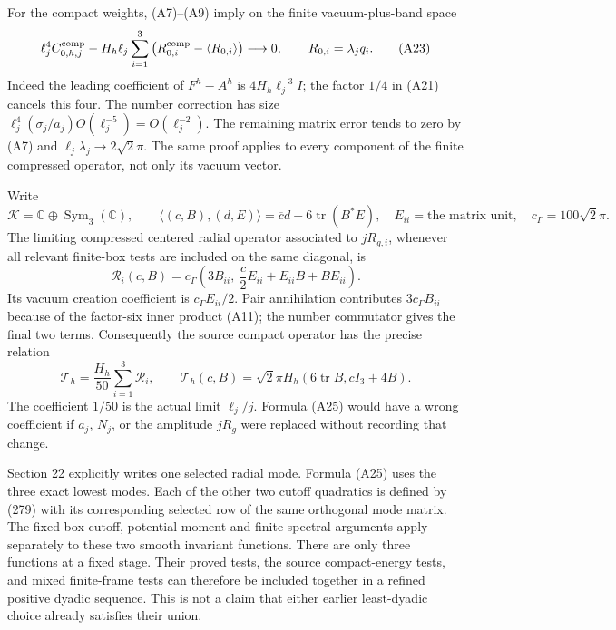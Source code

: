 \documentclass[
  11pt,
]{article}
\begin{document}
For the compact weights, (A7)--(A9) imply on the finite vacuum-plus-band
space \[
 \ell_j^4C^{\rm comp}_{0,h,j}
 -H_h\ell_j\sum_{i=1}^3
     \left(R^{\rm comp}_{0,i}-\langle R_{0,i}\rangle\right)
 \longrightarrow0,
 \qquad R_{0,i}=\lambda_jq_i.
\tag{A23}
\] Indeed the leading coefficient of \(F^h-A^h\) is
\(4H_h\ell_j^{-3}I\); the factor \(1/4\) in (A21) cancels this four. The
number correction has size
\(\ell_j^4(\sigma_j/a_j)O(\ell_j^{-5})=O(\ell_j^{-2})\). The remaining
matrix error tends to zero by (A7) and \(\ell_j\lambda_j\to2\sqrt2\pi\).
The same proof applies to every component of the finite compressed
operator, not only its vacuum vector.

Write \[
 \mathcal K=\mathbb C\oplus\operatorname{Sym}_3(\mathbb C),\qquad
 \langle(c,B),(d,E)\rangle=\overline c d+6\operatorname{tr}(B^*E),
 \quad E_{ii}=\text{the matrix unit},\quad c_\Gamma=100\sqrt2\pi.
\] The limiting compressed centered radial operator associated to
\(jR_{g,i}\), whenever all relevant finite-box tests are included on the
same diagonal, is \[
 \mathcal R_i(c,B)=c_\Gamma\left(
       3B_{ii},\ \frac c2E_{ii}+E_{ii}B+BE_{ii}\right).
\tag{A24}
\] Its vacuum creation coefficient is \(c_\Gamma E_{ii}/2\). Pair
annihilation contributes \(3c_\Gamma B_{ii}\) because of the factor-six
inner product (A11); the number commutator gives the final two terms.
Consequently the source compact operator has the precise relation \[
 \boxed{\mathcal T_h=\frac{H_h}{50}\sum_{i=1}^3\mathcal R_i,
 \qquad
 \mathcal T_h(c,B)=\sqrt2\pi H_h(6\operatorname{tr}B,cI_3+4B).}
\tag{A25}
\] The coefficient \(1/50\) is the actual limit \(\ell_j/j\). Formula
(A25) would have a wrong coefficient if \(a_j\), \(N_j\), or the
amplitude \(jR_g\) were replaced without recording that change.

Section 22 explicitly writes one selected radial mode. Formula (A25)
uses the three exact lowest modes. Each of the other two cutoff
quadratics is defined by (279) with its corresponding selected row of
the same orthogonal mode matrix. The fixed-box cutoff, potential-moment
and finite spectral arguments apply separately to these two smooth
invariant functions. There are only three functions at a fixed stage.
Their proved tests, the source compact-energy tests, and mixed
finite-frame tests can therefore be included together in a refined
positive dyadic sequence. This is not a claim that either earlier
least-dyadic choice already satisfies their union.
\end{document}
